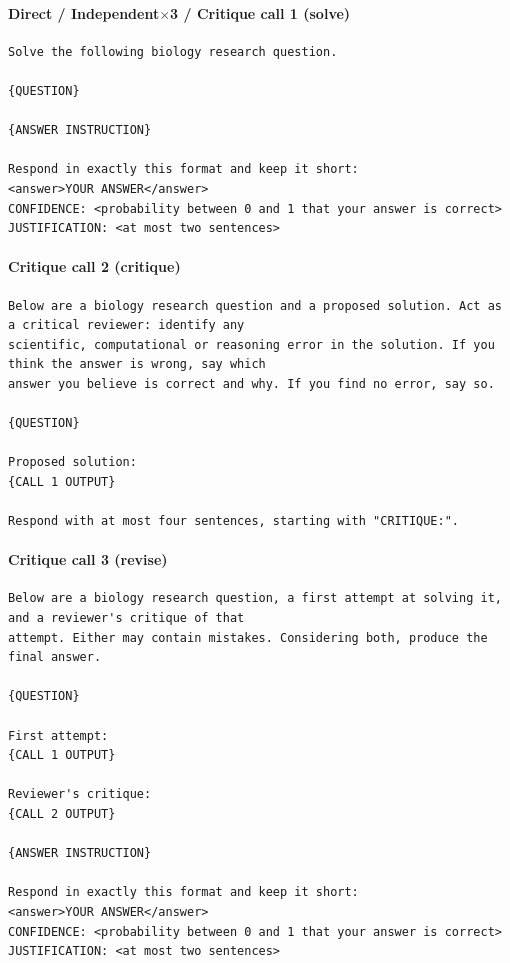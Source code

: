 \paragraph{Direct / Independent$\times$3 / Critique call 1 (solve)}
\begin{footnotesize}\begin{verbatim}
Solve the following biology research question.

{QUESTION}

{ANSWER INSTRUCTION}

Respond in exactly this format and keep it short:
<answer>YOUR ANSWER</answer>
CONFIDENCE: <probability between 0 and 1 that your answer is correct>
JUSTIFICATION: <at most two sentences>
\end{verbatim}\end{footnotesize}

\paragraph{Critique call 2 (critique)}
\begin{footnotesize}\begin{verbatim}
Below are a biology research question and a proposed solution. Act as a critical reviewer: identify any
scientific, computational or reasoning error in the solution. If you think the answer is wrong, say which
answer you believe is correct and why. If you find no error, say so.

{QUESTION}

Proposed solution:
{CALL 1 OUTPUT}

Respond with at most four sentences, starting with "CRITIQUE:".
\end{verbatim}\end{footnotesize}

\paragraph{Critique call 3 (revise)}
\begin{footnotesize}\begin{verbatim}
Below are a biology research question, a first attempt at solving it, and a reviewer's critique of that
attempt. Either may contain mistakes. Considering both, produce the final answer.

{QUESTION}

First attempt:
{CALL 1 OUTPUT}

Reviewer's critique:
{CALL 2 OUTPUT}

{ANSWER INSTRUCTION}

Respond in exactly this format and keep it short:
<answer>YOUR ANSWER</answer>
CONFIDENCE: <probability between 0 and 1 that your answer is correct>
JUSTIFICATION: <at most two sentences>
\end{verbatim}\end{footnotesize}


